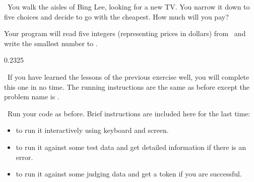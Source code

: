 
\Question\ You walk the aisles of Bing Lee, looking for a new TV. You narrow it down to
five choices and decide to go with the cheapest. How much will you pay?

Your program will read five integers (representing prices in dollars) from \IN\ and write
the smallest number to \OUT.

\Sample

       {0.2}{325}

\Scratch\ If you have learned the lessons of the previous exercise well, you will complete
this one in no time. The running instructions are the same as before except the problem
name is \problemtagtt.

\Afterword\ Run your code as before. Brief instructions are included here for the last time:
\begin{itemize}
    \item {} to run it interactively using keyboard and screen.
    \item {} to run it against some test data and
      get detailed information if there is an error.
    \item {} to run it against some judging data
      and get a token if you are successful.
\end{itemize}

